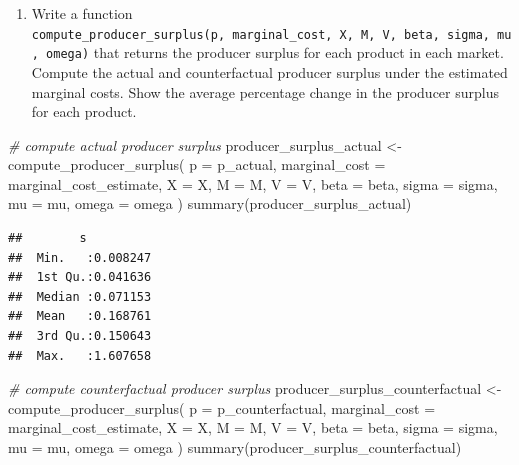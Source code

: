 \documentclass[
]{book}
\newenvironment{Shaded}{\begin{snugshade}}{\end{snugshade}}
\newcommand{\AttributeTok}[1]{\textcolor[rgb]{0.77,0.63,0.00}{#1}}
\newcommand{\CommentTok}[1]{\textcolor[rgb]{0.56,0.35,0.01}{\textit{#1}}}
\newcommand{\FunctionTok}[1]{\textcolor[rgb]{0.00,0.00,0.00}{#1}}
\newcommand{\NormalTok}[1]{#1}
\newcommand{\OtherTok}[1]{\textcolor[rgb]{0.56,0.35,0.01}{#1}}
\providecommand{\tightlist}{%
  \setlength{\itemsep}{0pt}\setlength{\parskip}{0pt}}
\begin{document}
\begin{enumerate}
\def\labelenumi{\arabic{enumi}.}
\setcounter{enumi}{2}
\tightlist
\item
  Write a function \texttt{compute\_producer\_surplus(p,\ marginal\_cost,\ X,\ M,\ V,\ beta,\ sigma,\ mu,\ omega)} that returns the producer surplus for each product in each market. Compute the actual and counterfactual producer surplus under the estimated marginal costs. Show the average percentage change in the producer surplus for each product.
\end{enumerate}

\begin{Shaded}
\begin{Highlighting}[]
\CommentTok{\# compute actual producer surplus}
\NormalTok{producer\_surplus\_actual }\OtherTok{\textless{}{-}}
  \FunctionTok{compute\_producer\_surplus}\NormalTok{(}
    \AttributeTok{p =}\NormalTok{ p\_actual, }
    \AttributeTok{marginal\_cost =}\NormalTok{ marginal\_cost\_estimate, }
    \AttributeTok{X =}\NormalTok{ X, }
    \AttributeTok{M =}\NormalTok{ M, }
    \AttributeTok{V =}\NormalTok{ V, }
    \AttributeTok{beta =}\NormalTok{ beta, }
    \AttributeTok{sigma =}\NormalTok{ sigma, }
    \AttributeTok{mu =}\NormalTok{ mu, }
    \AttributeTok{omega =}\NormalTok{ omega}
\NormalTok{    )}
\FunctionTok{summary}\NormalTok{(producer\_surplus\_actual)}
\end{Highlighting}
\end{Shaded}

\begin{verbatim}
##        s           
##  Min.   :0.008247  
##  1st Qu.:0.041636  
##  Median :0.071153  
##  Mean   :0.168761  
##  3rd Qu.:0.150643  
##  Max.   :1.607658
\end{verbatim}

\begin{Shaded}
\begin{Highlighting}[]
\CommentTok{\# compute counterfactual producer surplus}
\NormalTok{producer\_surplus\_counterfactual }\OtherTok{\textless{}{-}}
  \FunctionTok{compute\_producer\_surplus}\NormalTok{(}
    \AttributeTok{p =}\NormalTok{ p\_counterfactual, }
    \AttributeTok{marginal\_cost =}\NormalTok{ marginal\_cost\_estimate, }
    \AttributeTok{X =}\NormalTok{ X, }
    \AttributeTok{M =}\NormalTok{ M, }
    \AttributeTok{V =}\NormalTok{ V, }
    \AttributeTok{beta =}\NormalTok{ beta, }
    \AttributeTok{sigma =}\NormalTok{ sigma, }
    \AttributeTok{mu =}\NormalTok{ mu, }
    \AttributeTok{omega =}\NormalTok{ omega}
\NormalTok{    )}
\FunctionTok{summary}\NormalTok{(producer\_surplus\_counterfactual)}
\end{Highlighting}
\end{Shaded}
\end{document}
